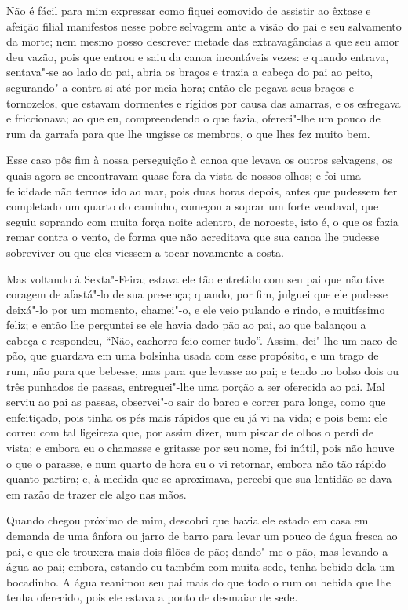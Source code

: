 Não é fácil para mim expressar como fiquei comovido de assistir ao
êxtase e afeição filial manifestos nesse pobre selvagem ante a visão do
pai e seu salvamento da morte; nem mesmo posso descrever metade das
extravagâncias a que seu amor deu vazão, pois que entrou e saiu da canoa
incontáveis vezes: e quando entrava, sentava"-se ao lado do pai, abria os
braços e trazia a cabeça do pai ao peito, segurando"-a contra si até por
meia hora; então ele pegava seus braços e tornozelos, que estavam
dormentes e rígidos por causa das amarras, e os esfregava e friccionava;
ao que eu, compreendendo o que fazia, ofereci"-lhe um pouco de rum da
garrafa para que lhe ungisse os membros, o que lhes fez muito bem.

Esse caso pôs fim à nossa perseguição à canoa que levava os outros
selvagens, os quais agora se encontravam quase fora da vista de nossos
olhos; e foi uma felicidade não termos ido ao mar, pois duas horas
depois, antes que pudessem ter completado um quarto do caminho, começou
a soprar um forte vendaval, que seguiu soprando com muita força noite
adentro, de noroeste, isto é, o que os fazia remar contra o vento, de
forma que não acreditava que sua canoa lhe pudesse sobreviver ou que
eles viessem a tocar novamente a costa.

Mas voltando à Sexta"-Feira; estava ele tão entretido com seu pai que não
tive coragem de afastá"-lo de sua presença; quando, por fim, julguei que
ele pudesse deixá"-lo por um momento, chamei"-o, e ele veio pulando e
rindo, e muitíssimo feliz; e então lhe perguntei se ele havia dado pão
ao pai, ao que balançou a cabeça e respondeu, ``Não, cachorro feio comer
tudo''. Assim, dei"-lhe um naco de pão, que guardava em uma bolsinha
usada com esse propósito, e um trago de rum, não para que bebesse, mas
para que levasse ao pai; e tendo no bolso dois ou três punhados de
passas, entreguei"-lhe uma porção a ser oferecida ao pai. Mal serviu ao
pai as passas, observei"-o sair do barco e correr para longe, como que
enfeitiçado, pois tinha os pés mais rápidos que eu já vi na vida; e pois
bem: ele correu com tal ligeireza que, por assim dizer, num piscar de
olhos o perdi de vista; e embora eu o chamasse e gritasse por seu nome,
foi inútil, pois não houve o que o parasse, e num quarto de hora eu o vi
retornar, embora não tão rápido quanto partira; e, à medida que se
aproximava, percebi que sua lentidão se dava em razão de trazer ele algo
nas mãos.

Quando chegou próximo de mim, descobri que havia ele estado em casa em
demanda de uma ânfora ou jarro de barro para levar um pouco de água
fresca ao pai, e que ele trouxera mais dois filões de pão; dando"-me o
pão, mas levando a água ao pai; embora, estando eu também com muita
sede, tenha bebido dela um bocadinho. A água reanimou seu pai mais do
que todo o rum ou bebida que lhe tenha oferecido, pois ele estava a
ponto de desmaiar de sede.

